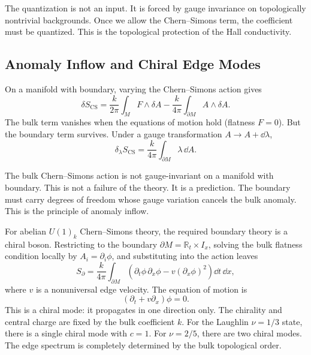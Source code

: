 The quantization is not an input. It is forced by gauge invariance on topologically nontrivial backgrounds. Once we allow the Chern--Simons term, the coefficient must be quantized. This is the topological protection of the Hall conductivity.

\subsection{Anomaly Inflow and Chiral Edge Modes}
\label{subsec:fqhe-anomaly-inflow}

On a manifold with boundary, varying the Chern--Simons action gives
\begin{equation}
  \delta S_{\mathrm{CS}}
  =
  \frac{k}{2\pi}\int_{M} F\wedge\delta A
  -
  \frac{k}{4\pi}\int_{\partial M} A\wedge\delta A.
  \label{eq:fqhe-boundary-variation}
\end{equation}
The bulk term vanishes when the equations of motion hold (flatness $F=0$). But the boundary term survives. Under a gauge transformation $A\to A+\dd\lambda$,
\begin{equation}
  \delta_\lambda S_{\mathrm{CS}}
  =
  \frac{k}{4\pi}\int_{\partial M}\lambda\,\dd A.
  \label{eq:fqhe-boundary-gauge-variation}
\end{equation}

The bulk Chern--Simons action is not gauge-invariant on a manifold with boundary. This is not a failure of the theory. It is a prediction. The boundary must carry degrees of freedom whose gauge variation cancels the bulk anomaly. This is the principle of anomaly inflow.

For abelian $U(1)_k$ Chern--Simons theory, the required boundary theory is a chiral boson. Restricting to the boundary $\partial M = \mathbb{R}_t\times I_x$, solving the bulk flatness condition locally by $A_i=\partial_i\phi$, and substituting into the action leaves
\begin{equation}
  S_{\partial}
  =
  \frac{k}{4\pi}\int_{\partial M}
  \left(\partial_t\phi\,\partial_x\phi
  -
  v(\partial_x\phi)^2\right)\dd t\,\dd x,
  \label{eq:fqhe-chiral-boson}
\end{equation}
where $v$ is a nonuniversal edge velocity. The equation of motion is
\begin{equation}
  (\partial_t + v\partial_x)\phi = 0.
  \label{eq:fqhe-chiral-eom}
\end{equation}
This is a chiral mode: it propagates in one direction only. The chirality and central charge are fixed by the bulk coefficient $k$. For the Laughlin $\nu=1/3$ state, there is a single chiral mode with $c=1$. For $\nu=2/5$, there are two chiral modes. The edge spectrum is completely determined by the bulk topological order.

